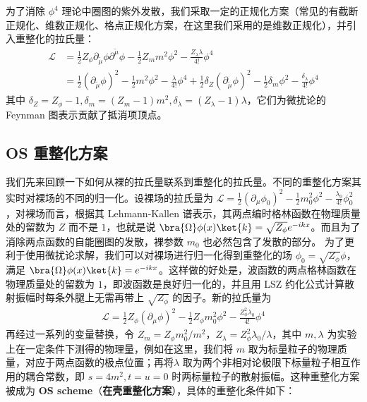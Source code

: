 为了消除 $\phi^4$ 理论中圈图的紫外发散，我们采取一定的正规化方案（常见的有截断正规化、维数正规化、格点正规化方案，在这里我们采用的是维数正规化），并引入重整化的拉氏量：
\begin{equation}
\begin{aligned}
\mathcal{L}
&=\frac{1}{2}Z_\phi \partial_\tilde{\mu} \phi \partial^\tilde{\mu} \phi - \frac{1}{2} Z_m m^2\phi^2 - \frac{Z_\lambda \lambda}{4!}\phi^4\\
&=\frac{1}{2}(\partial_\tilde{\mu}\phi)^2 - \frac{1}{2}m^2\phi^2 - \frac{\lambda}{4!}\phi^4+\frac{1}{2}\delta_Z (\partial_\tilde{\mu} \phi)^2 - \frac{1}{2}\delta_m \phi^2 - \frac{\delta_\lambda}{4!}\phi^4
\end{aligned}
\end{equation}
其中 $\delta_Z=Z_\phi-1,\delta_m = (Z_m-1)m^2,\delta_\lambda = (Z_\lambda-1)\lambda$，它们为微扰论的 Feynman 图表示贡献了抵消项顶点。

\subsection{OS 重整化方案}
我们先来回顾一下如何从裸的拉氏量联系到重整化的拉氏量。不同的重整化方案其实时对裸场的不同的归一化。设裸场的拉氏量为 $\mathcal{L}=\frac{1}{2} (\partial_\mu \phi_0)^2 - \frac{1}{2} m_0^2 \phi^2 - \frac{\lambda_0}{4!}\phi_0^2$，对裸场而言，根据其 Lehmann-Kallen 谱表示，其两点编时格林函数在物理质量处的留数为 $Z$ 而不是 $1$，也就是说 $\bra{\Omega}\phi(x) \ket{k}=\sqrt{Z_\phi}e^{-ikx}$。而且为了消除两点函数的自能圈图的发散，裸参数 $m_0$ 也必然包含了发散的部分。
为了更利于使用微扰论求解，我们可以对裸场进行归一化得到重整化的场 $\phi_0 = \sqrt{Z_\phi}\phi$，满足 $\bra{\Omega}\phi(x)\ket{k} = e^{-ikx}$。这样做的好处是，波函数的两点格林函数在物理质量处的留数为 $1$，即波函数是良好归一化的，并且用 LSZ 约化公式计算散射振幅时每条外腿上无需再带上 $\sqrt{Z_\phi}$ 的因子。新的拉氏量为
\begin{equation}
\begin{aligned}
\mathcal{L} = \frac{1}{2}Z_\phi (\partial_\mu\phi)^2 - \frac{1}{2} Z_\phi m_0^2 \phi^2 - \frac{Z_\phi^2\lambda_0}{4!} \phi^4
\end{aligned}
\end{equation}
再经过一系列的变量替换，令 $Z_m = Z_\phi m_0^2/m^2$，$Z_\lambda = Z_\phi^2 \lambda_0/\lambda$，其中 $m,\lambda$ 为实验上在一定条件下测得的物理量，例如在这里，我们将 $m$ 取为标量粒子的物理质量，对应于两点函数的极点位置；再将$\lambda$ 取为两个非相对论极限下标量粒子相互作用的耦合常数，即 $s=4m^2,t=u=0$ 时两标量粒子的散射振幅。这种重整化方案被成为 \textbf{OS scheme}（\textbf{在壳重整化方案}），具体的重整化条件如下：

